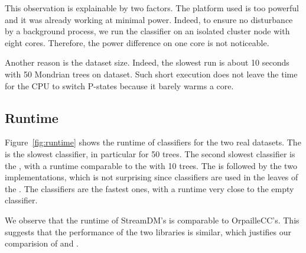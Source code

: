 This observation is explainable by two factors. The platform used is too powerful
and it was already working at minimal power. Indeed, to ensure no disturbance
by a background process, we run the classifier on an isolated cluster node with
eight cores. Therefore, the power difference on one core is not noticeable.

Another reason is the dataset size. Indeed, the slowest run is about
10 seconds with 50 Mondrian trees on \recofitdataset dataset.  Such short
execution does not leave the time for the CPU to switch P-states because it
barely warms a core.


\subsection{Runtime}
Figure~\ref{fig:runtime} shows the runtime of classifiers for the two real
datasets. The
\mondrianforest is the slowest classifier, in particular for 50 trees. The
second slowest classifier is the \hoeffdingtree, with a runtime comparable to the
\mondrianforest with 10 trees. The \hoeffdingtree is followed by the two \naivebayes
implementations, which is not surprising since \naivebayes classifiers are used
in the leaves of the \hoeffdingtree. The \mcnn classifiers are the fastest
ones, with a runtime very close to the empty classifier.

We observe that the runtime of StreamDM's \naivebayes is comparable to
 OrpailleCC's. This suggests that the performance of the two
 libraries is similar, which justifies our comparision of \hoeffdingtree
 and \mondrianforest.


